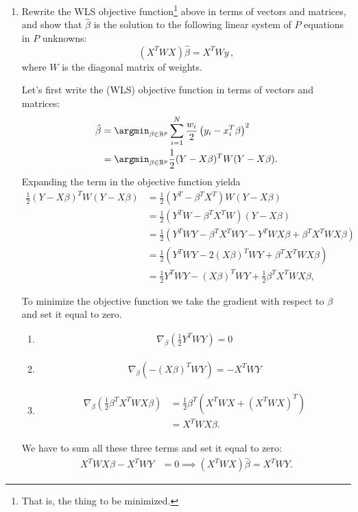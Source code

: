 \documentclass{article}
\begin{document}
\begin{enumerate}[label=(\Alph*)]

\item Rewrite the WLS objective function\footnote{That is, the thing to be minimized.} above in terms of vectors and matrices, and show that $\hat \beta$ is the solution to the following linear system of $P$ equations in $P$ unknowns:
$$
(X^T W X) \hat \beta = X^T W y \, ,
$$
where $W$ is the diagonal matrix of weights.


\bigskip
{\color{blue}
Let's first write the (WLS) objective function in terms of vectors and matrices:
		\begin{align}
			\hat{\beta} &= \argmin_{\beta \in \mathbb{R}^p} \sum_{i=1}^{N} \frac{w_i}{2} \left ( y_i - x_i^T\beta \right )^2 \\
			&= \argmin_{\beta \in \mathbb{R}^p} \frac{1}{2} (Y-X \beta)^T W (Y-X\beta).
		\end{align}
		Expanding the term in the objective function yielda
		\begin{align}
			\frac{1}{2} (Y-X \beta)^T W (Y-X\beta) &= \frac{1}{2} (Y^T - \beta^T X^T)W(Y-X\beta) \\
			&= \frac{1}{2} (Y^TW - \beta^T X^TW)(Y-X\beta) \\
			&= \frac{1}{2} (Y^TWY -\beta^TX^TWY-Y^TWX\beta + \beta^TX^TWX\beta) \\
			&= \frac{1}{2} (Y^TWY - 2(X\beta)^TWY +\beta^TX^TWX\beta) \\
			&= \frac{1}{2} Y^TWY - (X\beta)^TWY + \frac{1}{2} \beta^TX^TWX\beta, \label{eqn1}
		\end{align}

		To minimize the  objective function we take the gradient with respect to $\beta$ and set it equal to zero. 
		\begin{enumerate}
			\item %
				\begin{align}
					\nabla_{\beta}( \frac{1}{2} Y^TWY )= 0
				\end{align}
			\item %
				\begin{align}
					\nabla_{\beta} (-(X\beta)^TWY) = - X^TWY
				\end{align}
			\item %
				\begin{align}
					\nabla_{\beta} (\frac{1}{2} \beta^TX^TWX\beta) &= \frac{1}{2} \beta^T (X^TWX + (X^TWX)^T) \\
					&= X^TWX\beta.
				\end{align}
		\end{enumerate}
		We have to sum all these three terms and set it equal to zero:
            \begin{align}
			X^TWX\beta - X^TWY &= 0 \implies
			 (X^TWX)\hat{\beta} = X^TWY.
			 \end{align}


}
\end{enumerate}
\end{document}
